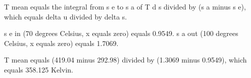 T mean equals the integral from s e to s a of T d s divided by (s a minus s e), which equals delta u divided by delta s.  

s e in (70 degrees Celsius, x equals zero) equals 0.9549.  
s a out (100 degrees Celsius, x equals zero) equals 1.7069.  

T mean equals (419.04 minus 292.98) divided by (1.3069 minus 0.9549), which equals 358.125 Kelvin.